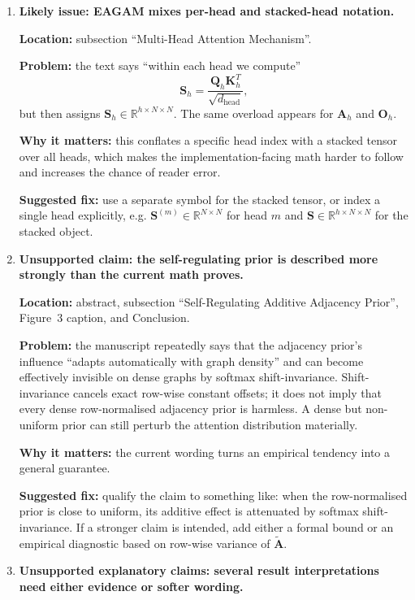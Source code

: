\documentclass[11pt]{article}
\begin{document}
\begin{enumerate}
\item \textbf{Likely issue: EAGAM mixes per-head and stacked-head notation.}

\textbf{Location:} subsection ``Multi-Head Attention Mechanism''.

\textbf{Problem:} the text says ``within each head we compute''
\[
\mathbf{S}_h = \frac{\mathbf{Q}_h \mathbf{K}_h^T}{\sqrt{d_{\text{head}}}},
\]
but then assigns $\mathbf{S}_h \in \mathbb{R}^{h \times N \times N}$. The same overload appears for $\mathbf{A}_h$ and $\mathbf{O}_h$.

\textbf{Why it matters:} this conflates a specific head index with a stacked tensor over all heads, which makes the implementation-facing math harder to follow and increases the chance of reader error.

\textbf{Suggested fix:} use a separate symbol for the stacked tensor, or index a single head explicitly, e.g. $\mathbf{S}^{(m)} \in \mathbb{R}^{N \times N}$ for head $m$ and $\mathbf{S} \in \mathbb{R}^{h \times N \times N}$ for the stacked object.

\item \textbf{Unsupported claim: the self-regulating prior is described more strongly than the current math proves.}

\textbf{Location:} abstract, subsection ``Self-Regulating Additive Adjacency Prior'', Figure~3 caption, and Conclusion.

\textbf{Problem:} the manuscript repeatedly says that the adjacency prior's influence ``adapts automatically with graph density'' and can become effectively invisible on dense graphs by softmax shift-invariance. Shift-invariance cancels exact row-wise constant offsets; it does not imply that every dense row-normalised adjacency prior is harmless. A dense but non-uniform prior can still perturb the attention distribution materially.

\textbf{Why it matters:} the current wording turns an empirical tendency into a general guarantee.

\textbf{Suggested fix:} qualify the claim to something like: when the row-normalised prior is close to uniform, its additive effect is attenuated by softmax shift-invariance. If a stronger claim is intended, add either a formal bound or an empirical diagnostic based on row-wise variance of $\tilde{\mathbf{A}}$.

\item \textbf{Unsupported explanatory claims: several result interpretations need either evidence or softer wording.}


\end{enumerate}
\end{document}
